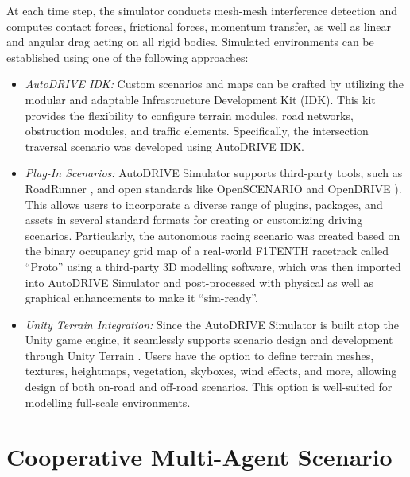 \documentclass[letterpaper, 10 pt, conference]{ieeeconf}  %
\begin{document}
	At each time step, the simulator conducts mesh-mesh interference detection and computes contact forces, frictional forces, momentum transfer, as well as linear and angular drag acting on all rigid bodies. Simulated environments can be established using one of the following approaches:
	\begin{itemize}
		\item \textit{AutoDRIVE IDK:} Custom scenarios and maps can be crafted by utilizing the modular and adaptable Infrastructure Development Kit (IDK). This kit provides the flexibility to configure terrain modules, road networks, obstruction modules, and traffic elements. Specifically, the intersection traversal scenario was developed using AutoDRIVE IDK.
		
		\item \textit{Plug-In Scenarios:} AutoDRIVE Simulator supports third-party tools, such as RoadRunner \cite{RoadRunner2021}, and open standards like OpenSCENARIO \cite{OpenSCENARIO2021} and OpenDRIVE \cite{OpenDRIVE2021}). This allows users to incorporate a diverse range of plugins, packages, and assets in several standard formats for creating or customizing driving scenarios. Particularly, the autonomous racing scenario was created based on the binary occupancy grid map of a real-world F1TENTH racetrack called ``Proto'' using a third-party 3D modelling software, which was then imported into AutoDRIVE Simulator and post-processed with physical as well as graphical enhancements to make it ``sim-ready''.
		
		\item \textit{Unity Terrain Integration:} Since the AutoDRIVE Simulator is built atop the Unity \cite{Unity2021} game engine, it seamlessly supports scenario design and development through Unity Terrain \cite{UnityTerrain2021}. Users have the option to define terrain meshes, textures, heightmaps, vegetation, skyboxes, wind effects, and more, allowing design of both on-road and off-road scenarios. This option is well-suited for modelling full-scale environments.
	\end{itemize}
	
	
	\section{Cooperative Multi-Agent Scenario}
	\label{Section: Cooperative Multi-Agent Scenario}
	
\end{document}
